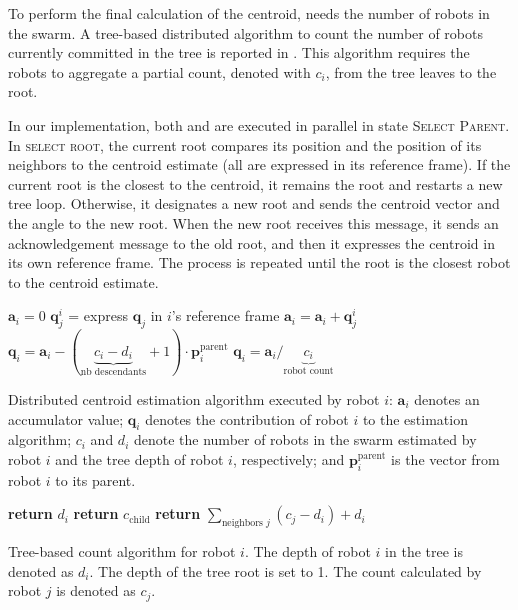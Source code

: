 To perform the final calculation of the centroid,  needs
the number of robots in the swarm. A tree-based distributed algorithm
to count the number of robots currently committed in the tree is
reported in . This algorithm requires the robots to
aggregate a partial count, denoted with $c_i$, from the tree leaves to
the root.

In our implementation, both  and  are
executed in parallel in state \textsc{Select Parent}. In
\textsc{select root}, the current root compares its position and the
position of its neighbors to the centroid estimate (all are expressed
in its reference frame). If the current root is the closest to the
centroid, it remains the root and restarts a new tree loop. Otherwise,
it designates a new root and sends the centroid vector and the angle
to the new root. When the new root receives this message, it sends an
acknowledgement message to the old root, and then it expresses the
centroid in its own reference frame. The process is repeated until the
root is the closest robot to the centroid estimate.

\begin{algorithm} [t]
  \begin{algorithmic}[1]
    \State $\mathbf{a}_i = 0$
    \State $\mathbf{q}_j^i$ = express $\mathbf{q}_j$ in $i$'s reference frame
    \State $\mathbf{a}_i = \mathbf{a}_i + \mathbf{q}_j^i$
    \EndFor
      \State $\mathbf{q}_i =  \mathbf{a}_i - (\underbrace{c_i - d_i}_{\text{nb descendants}} + 1) \cdot \mathbf{p}^{\text{parent}}_i$
    \EndIf
      \State $\mathbf{q}_i =  \mathbf{a}_i / \underbrace{c_i}_{\text{robot count}}$
    \EndIf
  \end{algorithmic}
  \caption{Distributed centroid estimation algorithm executed by robot
    $i$: $\mathbf{a}_i$ denotes an accumulator value; $\mathbf{q}_i$
    denotes the contribution of robot $i$ to the estimation algorithm;
    $c_i$ and $d_i$ denote the number of robots in the swarm estimated
    by robot $i$ and the tree depth of robot $i$, respectively; and
    $\mathbf{p}^{\text{parent}}_i$ is the vector from robot $i$ to its
    parent.}
  \label{alg:centroid}
\end{algorithm}

\begin{algorithm} [t]
  \begin{algorithmic}[1]
        \State \textbf{return} $d_i$
      \EndCase
        \State \textbf{return} $c_{\text{child}}$
      \EndCase
      \Default
        \State \textbf{return} $\sum_{\text{neighbors }j} (c_j - d_i) + d_i$
      \EndDefault
    \EndSwitch
  \end{algorithmic}
  \caption{Tree-based count algorithm for robot $i$. The depth of
    robot $i$ in the tree is denoted as $d_i$. The depth of the tree
    root is set to 1. The count calculated by robot $j$ is denoted as
    $c_j$.}
  \label{alg:count}
\end{algorithm}


